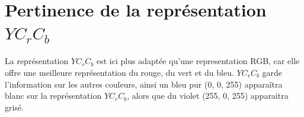 \documentclass[11pt]{article}
\begin{document}
\section{Pertinence de la représentation $YC_{r}C_{b}$}
	
	La représentation $YC_{r}C_{b}$ est ici plus adaptée qu'une representation RGB, car elle offre une meilleure représentation du rouge, du vert et du bleu. $YC_{r}C_{b}$ garde l'information sur les autres couleurs, ainsi un bleu pur (0, 0, 255) apparaîtra blanc sur la représentation $YC_{r}C_{b}$, alors que du violet (255, 0, 255) apparaitra grisé.
\end{document}
